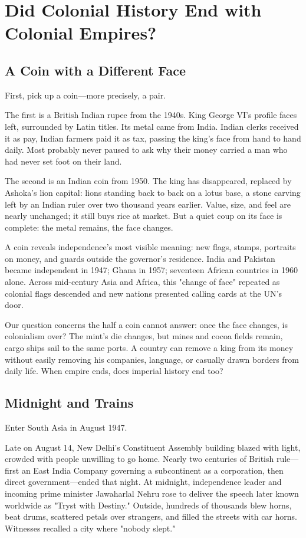 \chapter[Did Colonial History End?]{Did Colonial History End with Colonial Empires?}
\section{A Coin with a Different Face}
First, pick up a coin---more precisely, a pair.

The first is a British Indian rupee from the 1940s. King George VI's profile faces left, surrounded by Latin titles. Its metal came from India. Indian clerks received it as pay, Indian farmers paid it as tax, passing the king's face from hand to hand daily. Most probably never paused to ask why their money carried a man who had never set foot on their land.

The second is an Indian coin from 1950. The king has disappeared, replaced by Ashoka's lion capital: lions standing back to back on a lotus base, a stone carving left by an Indian ruler over two thousand years earlier. Value, size, and feel are nearly unchanged; it still buys rice at market. But a quiet coup on its face is complete: the metal remains, the face changes.

A coin reveals independence's most visible meaning: new flags, stamps, portraits on money, and guards outside the governor's residence. India and Pakistan became independent in 1947; Ghana in 1957; seventeen African countries in 1960 alone. Across mid-century Asia and Africa, this "change of face" repeated as colonial flags descended and new nations presented calling cards at the UN's door.

Our question concerns the half a coin cannot answer: once the face changes, is colonialism over? The mint's die changes, but mines and cocoa fields remain, cargo ships sail to the same ports. A country can remove a king from its money without easily removing his companies, language, or casually drawn borders from daily life. When empire ends, does imperial history end too?

\section{Midnight and Trains}
Enter South Asia in August 1947.

Late on August 14, New Delhi's Constituent Assembly building blazed with light, crowded with people unwilling to go home. Nearly two centuries of British rule---first an East India Company governing a subcontinent as a corporation, then direct government---ended that night. At midnight, independence leader and incoming prime minister Jawaharlal Nehru rose to deliver the speech later known worldwide as "Tryst with Destiny." Outside, hundreds of thousands blew horns, beat drums, scattered petals over strangers, and filled the streets with car horns. Witnesses recalled a city where "nobody slept."

